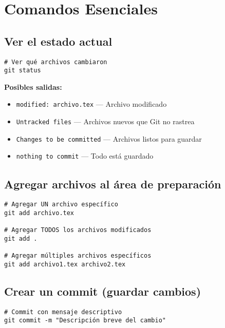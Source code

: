 \documentclass[11pt,a4paper]{article}
\begin{document}
\section{Comandos Esenciales}

\subsection{Ver el estado actual}

\begin{lstlisting}[style=bashstyle]
# Ver qué archivos cambiaron
git status
\end{lstlisting}

\textbf{Posibles salidas:}
\begin{itemize}
  \item \texttt{modified: archivo.tex} --- Archivo modificado
  \item \texttt{Untracked files} --- Archivos nuevos que Git no rastrea
  \item \texttt{Changes to be committed} --- Archivos listos para guardar
  \item \texttt{nothing to commit} --- Todo está guardado
\end{itemize}

\subsection{Agregar archivos al área de preparación}

\begin{lstlisting}[style=bashstyle]
# Agregar UN archivo específico
git add archivo.tex

# Agregar TODOS los archivos modificados
git add .

# Agregar múltiples archivos específicos
git add archivo1.tex archivo2.tex
\end{lstlisting}

\subsection{Crear un commit (guardar cambios)}

\begin{lstlisting}[style=bashstyle]
# Commit con mensaje descriptivo
git commit -m "Descripción breve del cambio"
\end{lstlisting}
\end{document}
